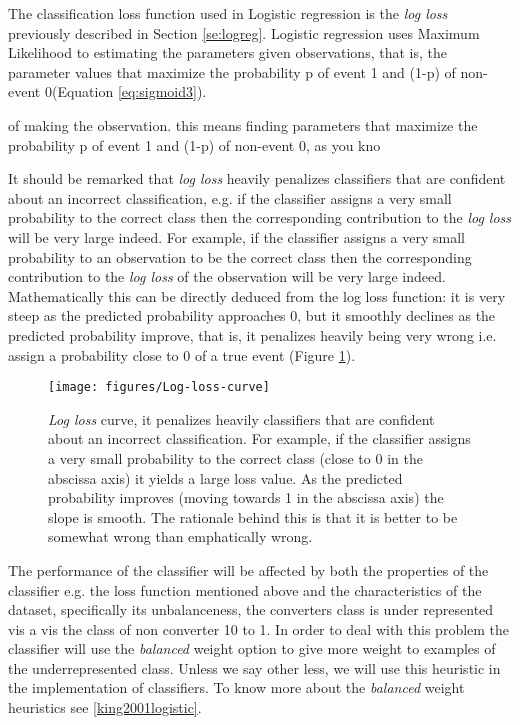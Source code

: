 \documentclass[11pt]{article}
\theoremstyle{definition}
\theoremstyle{remark}
\begin{document}
The classification loss function used in Logistic regression is the \emph{log loss} previously described in Section \ref{se:logreg}. Logistic regression uses Maximum Likelihood to estimating the parameters given observations, that is, the parameter values that maximize the probability p of event 1 and (1-p) of non-event 0(Equation \ref{eq:sigmoid3}).


of making the observation. this means finding parameters that maximize the probability p of event 1 and (1-p) of non-event 0, as you kno

It should be remarked that \emph{log loss} heavily penalizes classifiers that are confident about an incorrect classification, e.g. if the classifier assigns a very small probability to the correct class then the corresponding contribution to the \emph{log loss} will be very large indeed. 
For example, if the classifier assigns a very small probability to an observation to be the correct class then the corresponding contribution to the \emph{log loss} of the observation will be very large indeed. Mathematically this can be directly deduced from the log loss function: it is very steep as the predicted probability approaches 0, but it smoothly declines as the predicted probability improve, that is, it penalizes heavily being very wrong i.e. assign a probability close to 0 of a true event (Figure \ref{fig:Log-loss-curve}). 
\begin{figure}[H]
        \centering
        \texttt{[image: figures/Log-loss-curve]}
        \caption{\emph{Log loss} curve, it penalizes heavily classifiers that are confident about an incorrect classification. For example, if the classifier assigns a very small probability to the correct class (close to 0 in the abscissa axis) it yields a large loss value. As the predicted probability improves (moving towards 1 in the  abscissa axis) the slope is smooth. The rationale behind this is that it is better to be somewhat wrong than emphatically wrong. 
        }
\label{fig:Log-loss-curve}
\end{figure}

The performance of the classifier will be affected by both the properties of the classifier e.g. the loss function mentioned above and the characteristics of the dataset, specifically its unbalanceness, the converters class is under represented vis a vis the class of non converter 10 to 1. In order to deal with this problem the classifier will use the \emph{balanced} weight option to give more weight to examples of the underrepresented class. Unless we say other less, we will use this heuristic in the implementation of classifiers. To know more about the \emph{balanced} weight heuristics see \ref{king2001logistic}. 
\end{document}
